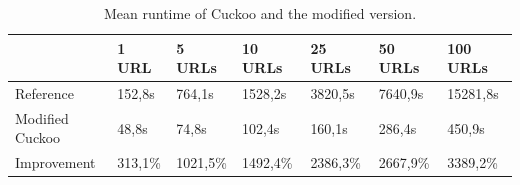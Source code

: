 \begin{table}[h]
\caption{Mean runtime of Cuckoo and the modified version.}
\label{tbl:results}
\begin{tabular}{@{}lllllll@{}}
\toprule
                & 1 URL    & 5 URLs   & 10 URLs      & 25 URLs      & 50 URLs     & 100 URLs \\ \midrule
Reference       & 152,8s   & 764,1s   & 1528,2s      & 3820,5s      & 7640,9s     & 15281,8s \\
Modified Cuckoo & 48,8s    & 74,8s    & 102,4s       & 160,1s       & 286,4s      & 450,9s   \\
Improvement     & 313,1\%  & 1021,5\% & 1492,4\%     & 2386,3\%     & 2667,9\%    & 3389,2\% \\ \bottomrule
\end{tabular}
\end{table}
